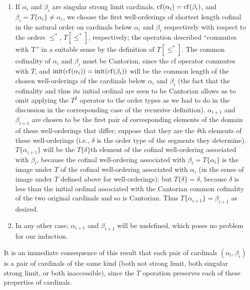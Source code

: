 \begin{enumerate}
 \item If $\alpha_i$ and $\beta_i$ are singular strong limit cardinals,
   $\mathop{\mathrm{cf}}(\alpha_i) = \mathop{\mathrm{cf}}(\beta_i)$, and $\beta_i =  T\{\alpha_i\} \neq
   \alpha_i$, we choose the first well-orderings of
   shortest length cofinal in the natural order on cardinals below
   $\alpha_i$ and $\beta_i$ respectively with respect to the orders
   $\leq^*$, $T[\leq^*]$, respectively; the operation described
   ``commutes with T'' in a suitable sense by the definition of
   $T[\leq^*]$.  The common cofinality  of $\alpha_i$ and
   $\beta_i$ must be Cantorian, since the cf operator
   commutes with $T$, and 
   $\mathop{\mathrm{init}}(\mathop{\mathrm{cf}}(\alpha_i)) = \mathop{\mathrm{init}}(\mathop{\mathrm{cf}}(\beta_i))$ will be the common length
   of the chosen well-orderings of the cardinals below $\alpha_i$ and
   $\beta_i$ (the fact that the cofinality and thus its initial
   ordinal are seen to be
   Cantorian allows us to omit applying the $T^2$
   operator to the order types as we had to do in the discussion in the
   corresponding case of the recursive definition). $\alpha_{i+1}$ and
   $\beta_{i+1}$ are chosen to be the first pair of corresponding
   elements of the domain of these well-orderings
   that differ; suppose that they are the $\delta$th elements of these
   well-orderings (i.e., $\delta$ is the order type of
   the segments they determine).  $T\{\alpha_{i+1}\}$ will
   be the $T\{\delta\}$th element of the cofinal well-ordering associated
   with $\beta_i$, because the cofinal well-ordering associated with
   $\beta_i = T\{\alpha_i\}$ is the image under $T$ of the cofinal
   well-ordering associated with $\alpha_i$ (in the sense of image under
   $T$ defined above for well-orderings); but $T\{\delta\}  = \delta$,
   because $\delta$ is less than the initial ordinal
   associated with the Cantorian common cofinality of
   the two original cardinals and so is Cantorian.  Thus
   $T\{\alpha_{i+1}\} = \beta_{i+1}$ as desired.

 \item In any other case, $\alpha_{i+1}$ and $\beta_{i+1}$ will be
   undefined, which poses no problem for our induction.
\end{enumerate}

It is an immediate consequence of this result that each pair of
cardinals $(\alpha_i,\beta_i)$ is a pair of cardinals of the same kind
(both not strong limit, both singular strong limit, or both
inaccessible), since the $T$ operation preserves
each of these properties of cardinals.

